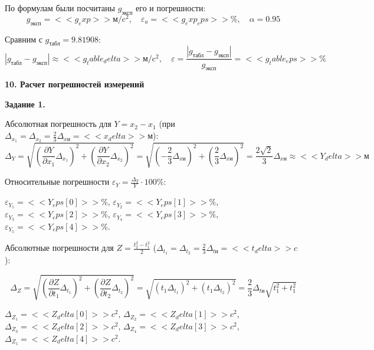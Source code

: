 \documentclass[14pt]{extreport}
\begin{document}
По формулам были посчитаны $g_\text{эксп}$ его и погрешности:
\begin{equation*}
g_\text{эксп} = <<g_exp>>\text{м}/\text{c}^2, \quad \varepsilon_a = <<g_exp_eps>>\%, \quad \alpha=0.95
\end{equation*}

Сравним с $g_\text{табл} = 9.81908$:
\begin{equation*}
|g_\text{табл} - g_\text{эксп}| \approx <<g_table_delta>>\text{м}/\text{c}^2, \quad \varepsilon = \frac{|g_\text{табл} - g_\text{эксп}|}{g_\text{эксп}} = <<g_table_eps>>\%
\end{equation*}

\noindent\textbf{10. Расчет погрешностей измерений}

\textbf{Задание 1.}

Абсолютная погрешность для $Y=x_2-x_1$ (при $\Delta_{x_1}=\Delta_{x_2}=\frac{2}{3}\Delta_{x\text{и}} = <<x_delta>>м$): 
{\fontsize{13}{13}\selectfont\begin{equation*}
    \Delta_Y =
    \sqrt{(\frac{\partial Y}{\partial x_1}\Delta_{x_1})^2+(\frac{\partial Y}{\partial x_2}\Delta_{x_2})^2} =
    \sqrt{(-\frac{2}{3}\Delta_{x\text{и}})^2+(\frac{2}{3}\Delta_{x\text{и}})^2} = 
    \frac{2\sqrt{2}}{3}\Delta_{x\text{и}} \approx <<Y_delta>>\text{м}
\end{equation*}}

Относительные погрешности $\varepsilon_Y=\frac{\Delta_Y}{Y}\cdot100\%$:

$\varepsilon_{Y_1}=<<Y_eps[0]>>\%$, $\varepsilon_{Y_2}=<<Y_eps[1]>>\%$, $\varepsilon_{Y_3}=<<Y_eps[2]>>\%$, $\varepsilon_{Y_4}=<<Y_eps[3]>>\%$, $\varepsilon_{Y_5}=<<Y_eps[4]>>\%$.

Абсолютные погрешности для $Z= \frac{t_2^2-t_1^2}{2}$  ($\Delta_{t_1}=\Delta_{t_2}=\frac{2}{3}\Delta_{t\text{и}} = <<t_delta>>c$): 

{\fontsize{13}{13}\selectfont\begin{equation*}
    \Delta_Z =
    \sqrt{(\frac{\partial Z}{\partial t_1}\Delta_{t_1})^2+(\frac{\partial Z}{\partial t_2}\Delta_{t_2})^2} =
    \sqrt{(t_1\Delta_{t_1})^2+(t_1\Delta_{t_2})^2} =
    \frac{2}{3}\Delta_{t\text{и}}\sqrt{t_1^2+t_1^2}
\end{equation*}}

$\Delta_{Z_1}=<<Z_delta[0]>> {c^2}$, $\Delta_{Z_2}=<<Z_delta[1]>> {c^2}$, $\Delta_{Z_3}=<<Z_delta[2]>> {c^2}$, $\Delta_{Z_4}=<<Z_delta[3]>> {c^2}$, $\Delta_{Z_5}=<<Z_delta[4]>> {c^2}$.
\end{document}
